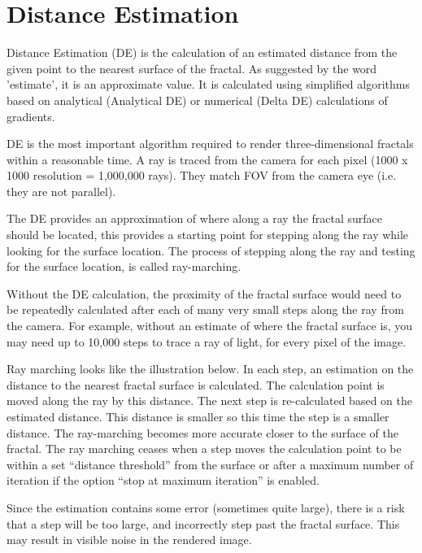 \section{Distance Estimation}\label{distance-estimation}

Distance Estimation (DE) is the calculation of an estimated distance from the
given point to the nearest surface of the fractal. As suggested by the word
'estimate', it is an approximate value. It is calculated using simplified
algorithms based on analytical (Analytical DE) or numerical (Delta DE)
calculations of gradients.

DE is the most important algorithm required to render three-dimensional fractals
within a reasonable time.  A ray is traced from the camera for each pixel (1000 x 1000 resolution = 1,000,000 rays). They match FOV from the camera eye (i.e. they are not
parallel).

The DE provides an approximation of where along a ray the fractal surface should be located, this provides a starting point for stepping along the ray while looking for the surface location.
The process of stepping along the ray and testing for the surface location, is called ray-marching.

Without the DE calculation, the proximity of the fractal surface would need to be repeatedly calculated after each of many very small steps along the ray from the camera. For example, without an estimate of where the fractal surface is, you may need up to 10,000 steps to trace a ray of light, for every pixel of the image.

Ray marching looks like the illustration below. In each step, an estimation on
the distance to the nearest fractal surface is calculated. The calculation point is moved
along the ray by this distance. The next step is re-calculated based on the
estimated distance. This distance is smaller so this time the step is a
smaller distance. The ray-marching becomes more accurate closer to the surface
of the fractal. The ray marching ceases when a step moves the calculation point to be within a set
``distance threshold'' from the surface or after a maximum number of iteration
if the option ``stop at maximum iteration'' is enabled.

Since the estimation contains some error (sometimes quite large), there is a risk that a step will be too large, and incorrectly step past the fractal surface. This may result in visible noise in the rendered image.

